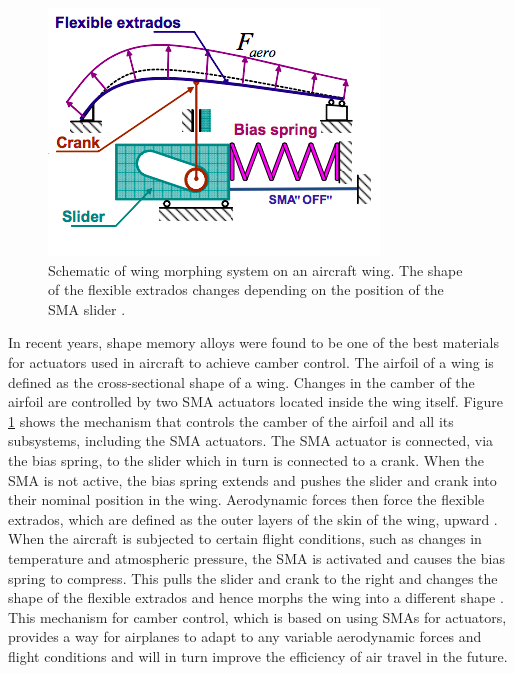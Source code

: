 \begin{multicols}{2}
\begin{figure}[H]
    \centering
    \includegraphics[scale=0.45]{._figures/SMA_Wing_Morphing_Diagram.png}
    \caption[Schematic of wing morphing system on an aircraft wing]{Schematic of wing morphing system on an aircraft wing. The shape of the flexible extrados changes depending on the position of the SMA slider \cite{brailovski2010sma}.}
    \label{fig:wing_morphing}
\end{figure}

In recent years, shape memory alloys were found to be one of the best materials for actuators used in aircraft to achieve camber control. The airfoil of a wing is defined as the cross-sectional shape of a wing. Changes in the camber of the airfoil are controlled by two SMA actuators located inside the wing itself. Figure \ref{fig:wing_morphing} shows the mechanism that controls the camber of the airfoil and all its subsystems, including the SMA actuators. The SMA actuator is connected, via the bias spring, to the slider which in turn is connected to a crank. When the SMA is not active, the bias spring extends and pushes the slider and crank into their nominal position in the wing. Aerodynamic forces then force the flexible extrados, which are defined as the outer layers of the skin of the wing, upward \cite{brailovski2010sma}. When the aircraft is subjected to certain flight conditions, such as changes in temperature and atmospheric pressure, the SMA is activated and causes the bias spring to compress. This pulls the slider and crank to the right and changes the shape of the flexible extrados and hence morphs the wing into a different shape \cite{brailovski2010sma}. This mechanism for camber control, which is based on using SMAs for actuators, provides a way for airplanes to adapt to any variable aerodynamic forces and flight conditions and will in turn improve the efficiency of air travel in the future. 


\end{multicols}
